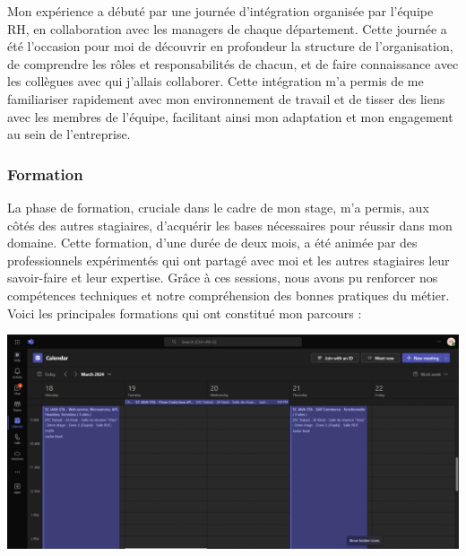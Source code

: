 Mon expérience a débuté par une journée d'intégration organisée par l'équipe RH, en collaboration avec les managers de chaque département. Cette journée a été l'occasion pour moi de découvrir en profondeur la structure de l'organisation, de comprendre les rôles et responsabilités de chacun, et de faire connaissance avec les collègues avec qui j'allais collaborer. Cette intégration m'a permis de me familiariser rapidement avec mon environnement de travail et de tisser des liens avec les membres de l'équipe, facilitant ainsi mon adaptation et mon engagement au sein de l'entreprise.
\subsubsection{Formation}


La phase de formation, cruciale dans le cadre de mon stage, m'a permis, aux côtés des autres stagiaires, d'acquérir les bases nécessaires pour réussir dans mon domaine. Cette formation, d'une durée de deux mois, a été animée par des professionnels expérimentés qui ont partagé avec moi et les autres stagiaires leur savoir-faire et leur expertise. Grâce à ces sessions, nous avons pu renforcer nos compétences techniques et notre compréhension des bonnes pratiques du métier. Voici les principales formations qui ont constitué mon parcours :
\begin{center}
    \centering
    \includegraphics[width=19cm]{Figures/formation.png}
    \label{fig:structure_payment}
\end{center}
